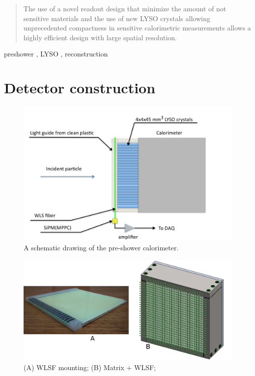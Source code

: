 \documentclass[final,5p,times,twocolumn]{elsarticle}
\begin{document}
\begin{frontmatter}
\begin{abstract}
The use of a novel readout design that minimize the amount of not sensitive materials and the use of new LYSO crystals allowing unprecedented compactness in sensitive calorimetric measurements allows a highly efficient design with large spatial resolution.
\end{abstract}
%
\begin{keyword}
preshower
\sep
LYSO
\sep
reconstruction
%
%
\end{keyword}
%
\end{frontmatter}
%
%
%
%
%
%
\section{Detector construction}
\begin{figure}
\includegraphics[width=0.98\linewidth]{ps_summary}
\caption{A schematic drawing of the pre-shower calorimeter.}
%
\end{figure}
%
\begin{figure}
\includegraphics[width=0.98\linewidth]{matrix_wlsf}
\caption{(A) WLSF mounting; (B) Matrix + WLSF;}
\end{figure}
\end{document}
